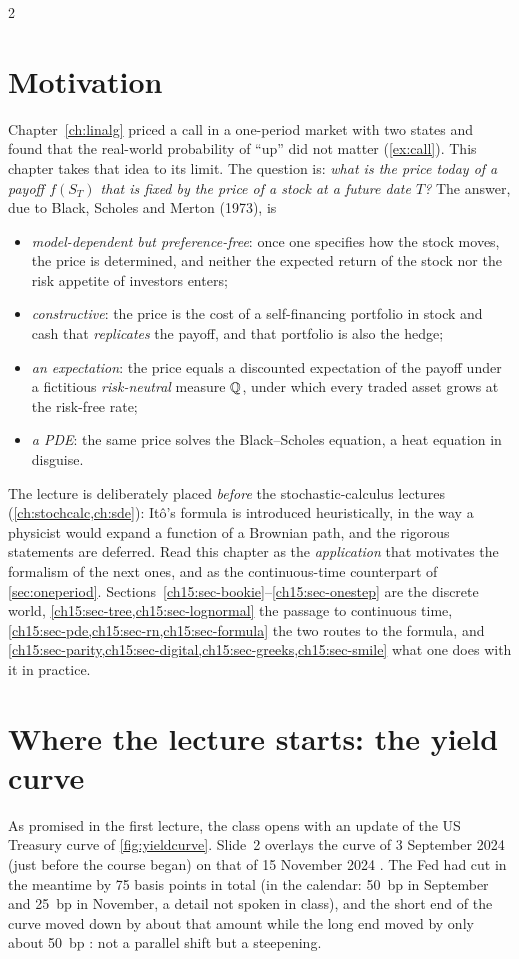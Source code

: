 \begin{paracol}{2}
\section*{Motivation}
Chapter~\ref{ch:linalg} priced a call in a one-period market with two states and found that the real-world
probability of ``up'' did not matter (\cref{ex:call}). This chapter takes that idea to its limit. The
question is: \emph{what is the price today of a payoff $f(S_T)$ that is fixed by the price of a stock at a
future date $T$?} The answer, due to Black, Scholes and Merton (1973), is
\begin{itemize}
  \item \emph{model-dependent but preference-free}: once one specifies how the stock moves, the price is
        determined, and neither the expected return of the stock nor the risk appetite of investors enters;
  \item \emph{constructive}: the price is the cost of a self-financing portfolio in stock and cash that
        \emph{replicates} the payoff, and that portfolio is also the hedge;
  \item \emph{an expectation}: the price equals a discounted expectation of the payoff under a fictitious
        \emph{risk-neutral} measure $\mathbb{Q}$, under which every traded asset grows at the risk-free rate;
  \item \emph{a PDE}: the same price solves the Black--Scholes equation, a heat equation in disguise.
\end{itemize}
The lecture is deliberately placed \emph{before} the stochastic-calculus lectures
(\cref{ch:stochcalc,ch:sde}): It\^o's formula is introduced heuristically, in the way a physicist would expand
a function of a Brownian path, and the rigorous statements are deferred. Read this chapter as the
\emph{application} that motivates the formalism of the next ones, and as the continuous-time counterpart of
\cref{sec:oneperiod}. Sections~\ref{ch15:sec-bookie}--\ref{ch15:sec-onestep} are the discrete world,
\cref{ch15:sec-tree,ch15:sec-lognormal} the passage to continuous time,
\cref{ch15:sec-pde,ch15:sec-rn,ch15:sec-formula} the two routes to the formula, and
\cref{ch15:sec-parity,ch15:sec-digital,ch15:sec-greeks,ch15:sec-smile} what one does with it in practice.

\section{Where the lecture starts: the yield curve}\label{ch15:sec-curve}
As promised in the first lecture, the class opens with an update of the US Treasury curve of \cref{fig:yieldcurve}.
Slide~2 overlays the curve of 3 September 2024 (just before the course began) on that of 15 November 2024
. The Fed had cut in the meantime by 75 basis points in total (in the calendar: 50~bp in September and
25~bp in November, a detail not spoken in class), and the short end of the curve moved down by about that
amount while the long end moved by only about 50~bp : not a parallel shift but a steepening.


\end{paracol}
